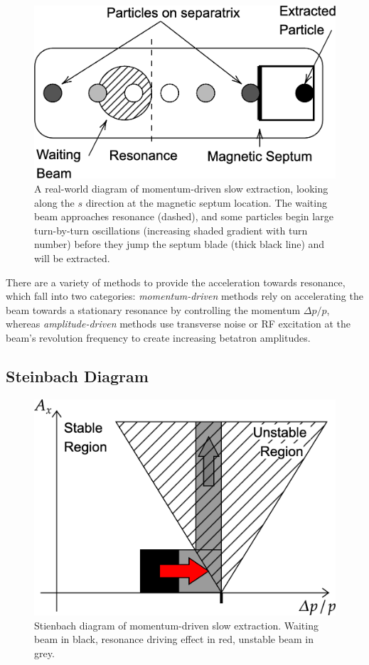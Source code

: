 \documentclass[11pt]{report}
\begin{document}
\begin{figure}
  \centering
  \includegraphics[width=0.6\linewidth]{real-world.png}
  \caption{A real-world diagram of momentum-driven slow extraction, looking along the $s$ direction at the magnetic septum location. The waiting beam approaches resonance (dashed), and some particles begin large turn-by-turn oscillations (increasing shaded gradient with turn number) before they jump the septum blade (thick black line) and will be extracted.}\label{fig:real-world}
\end{figure}

There are a variety of methods to provide the acceleration towards resonance, which fall into two categories: \textit{momentum-driven} methods rely on accelerating the beam towards a stationary resonance by controlling the momentum $\Delta p/p$, whereas \textit{amplitude-driven} methods use transverse noise or RF excitation at the beam's revolution frequency to create increasing betatron amplitudes.

\subsection{Steinbach Diagram}

\begin{figure}[ht]
  \centering
  \includegraphics[width=0.6\linewidth]{momentum-driven.png}
  \caption{Stienbach diagram of momentum-driven slow extraction. Waiting beam in black, resonance driving effect in red, unstable beam in grey.}\label{fig:momentum-driven}
\end{figure}
\end{document}

